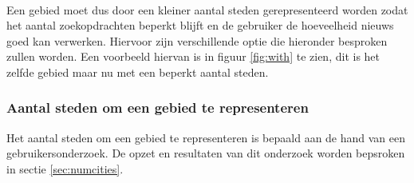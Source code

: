 \documentclass[twoside,openright]{uva-bachelor-thesis}
\begin{document}
		\\[0.5cm]
		Een gebied moet dus door een kleiner aantal steden gerepresenteerd worden zodat het aantal zoekopdrachten beperkt blijft en de gebruiker de hoeveelheid nieuws goed kan verwerken. Hiervoor zijn verschillende optie die hieronder besproken zullen worden. Een voorbeeld hiervan is in figuur \ref{fig:with} te zien, dit is het zelfde gebied maar nu met een beperkt aantal steden.
		
		\subsubsection{Aantal steden om een gebied te representeren}
			Het aantal steden om een gebied te representeren is bepaald aan de hand van een gebruikersonderzoek. De opzet en resultaten van dit onderzoek worden bepsroken in sectie \ref{sec:numcities}.
\end{document}
